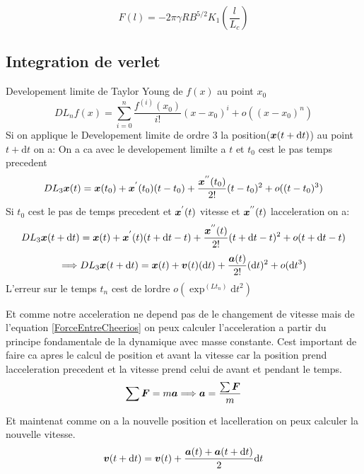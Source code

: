 \documentclass[a4paper, 11pt, oneside]{article} %
\newcommand{\dd}[1]{\mathrm{d}#1}
\begin{document}
    \begin{equation}
        \label{ForceEntreCheerios}
        F(l) = -2\pi \gamma R B^{5/2} K_1 \left( \frac{l}{L_c}\right)
    \end{equation}
    \subsection{Integration de verlet}
    Developement limite de Taylor Young de $f(x)$ au point $x_0$%
    \begin{equation}
        DL_n f(x) = \sum_{i=0}^{n}\frac{f^{(i)}(x_0)}{i!}(x-x_0)^i+ o((x-x_0)^n)
    \end{equation}
    Si on applique le Developement limite de ordre 3 la position($\vb*{x}(t+\dd t)$) au point $t+\dd t$ on a:
    On a ca avec le developement limilte a $t$ et $t_0$ cest le pas temps precedent
    \[DL_3 \vb*{x}(t) = \vb*{x}(t_0)+\vb*{x}^{'}(t_0)(t-t_0)+\frac{\vb*{x}^{''}(t_0)}{2!}(t-t_0)^2 +o((t-t_0)^3)\]
    Si $t_0$ cest le pas de temps precedent et $\vb*{x}^{'}(t)$ vitesse et $\vb*{x}^{''}(t)$ lacceleration on a:
        \[DL_3 \vb*{x}(t+\dd t) = \vb*{x}(t)+\vb*{x}^{'}(t)(t+\dd t-t)+\frac{\vb*{x}^{''}(t)}{2!}(t+\dd t-t)^2+o(t+\dd t-t)\]
        \[\Longrightarrow DL_3 \vb*{x}(t+\dd t)= \vb*{x}(t)+\vb*{v}(t)(\dd t)+\frac{\vb*{a}(t)}{2!}(\dd t)^2+o(\dd t^3)\]
    L'erreur sur le temps $t_n$ cest de lordre $o(\exp^(Lt_n)\dd t^2)$ %
    
    Et comme notre acceleration ne depend pas de le changement de vitesse mais de l'equation \ref{ForceEntreCheerios} on peux calculer l'acceleration a partir du principe fondamentale de la dynamique avec masse constante. Cest important de faire ca apres le calcul de position et avant la vitesse car la position prend lacceleration precedent et la vitesse prend celui de avant et pendant le temps.
    \begin{equation}
        \label{PFD}
        \sum  \vb*{F} = m\vb*{a} \Longrightarrow \vb*{a} = \frac{\sum \vb*{F}}{m}
    \end{equation}

    Et maintenat comme on a la nouvelle position et lacelleration on peux calculer la nouvelle vitesse.
    \begin{equation}
        \label{veletVitesse}
        \vb*{v}(t+\dd t) = \vb*{v}(t)+\frac{\vb*{a}(t)+\vb*{a}(t+\dd t)}{2}\dd t 
    \end{equation}
\end{document}
